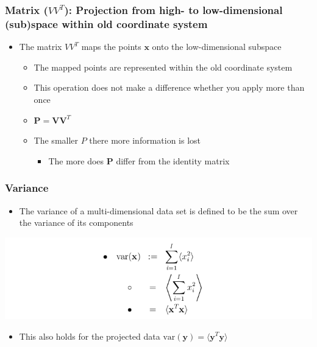 \documentclass[11pt]{article}
\begin{document}
\subsubsection{Matrix (\(VV^T\)): Projection from high- to low-dimensional (sub)space within old coordinate system}
\label{sec:org50b61a8}
\begin{itemize}
\item The matrix \(VV^T\) maps the points \(\pmb x\) onto the low-dimensional subspace
\begin{itemize}
\item The mapped points are represented within the old coordinate system
\item This operation does not make a difference whether you apply more than once
\item \(\pmb P = \pmb V \pmb V^T\)
\item The smaller \(P\) there more information is lost
\begin{itemize}
\item The more does \(\pmb P\) differ from the identity matrix
\end{itemize}
\end{itemize}
\end{itemize}

\subsubsection{Variance}
\label{sec:org2fd1130}
\begin{itemize}
\item The variance of a multi-dimensional data set is defined to be the sum over the variance of its components
\end{itemize}
\begin{center}
\includegraphics[width=.9\linewidth]{Principal Component Analysis/screenshot_2018-11-20_21-34-46.png}
\end{center}
\begin{itemize}
\item This also holds for the projected data \(\text{var}(\pmb y) = \langle \pmb y^T \pmb y \rangle\)
\end{itemize}
\end{document}

